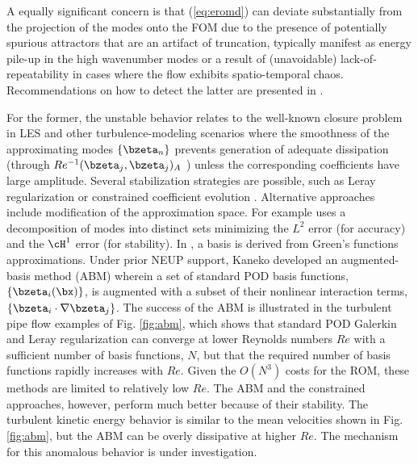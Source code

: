 A equally significant concern is that (\ref{eq:eromd}) can deviate substantially
from the projection of the modes onto the FOM due to the presence of potentially
spurious attractors that are an artifact of truncation, typically manifest as
energy pile-up in the high wavenumber modes \cite{fick18,rempfer00} or a
result of (unavoidable) lack-of-repeatability in cases where the flow 
exhibits spatio-temporal chaos.  Recommendations on how to detect the latter
are presented in \cite{tsai22a}.  

For the former, the unstable behavior relates to the well-known closure problem
in LES and other turbulence-modeling scenarios where the smoothness of the
approximating modes $\{\bzeta_n\}$ prevents generation of adequate dissipation
(through $Re^{-1} (\bzeta_j,\bzeta_j)_A$ ) unless the corresponding
coefficients have large amplitude.  
Several stabilization strategies are possible, such as Leray regularization
\cite{wang2012proper} or constrained coefficient evolution
\cite{fick18,kaneko20a}.  Alternative approaches include modification of the
approximation space.  For example \cite{akkari19} uses a decomposition of modes
into distinct sets minimizing the $L^2$ error (for accuracy) and the $\cH^1$
error (for stability).  In \cite{khodkar2019}, a basis is derived from Green's
functions approximations.
   Under prior NEUP support, Kaneko \cite{kaneko22a,kaneko22} developed an
augmented-basis method (ABM) wherein a set of standard POD basis functions,
$\{\bzeta_i(\bx) \}$,  is augmented with a subset of their nonlinear interaction
terms, $\{\bzeta_i \cdot \nabla \bzeta_j\}$.
  The success of the ABM is illustrated in the turbulent pipe flow
examples of Fig. \ref{fig:abm}, which shows that standard POD Galerkin and
Leray regularization can converge at lower Reynolds numbers $Re$ with a
sufficient number of basis functions, $N$, but that the required number of
basis functions rapidly increases with $Re$.  Given the $O(N^3)$ costs for the
ROM, these methods are limited to relatively low $Re$.  The ABM and
the constrained approaches, however, perform much better because of their
stability.  The turbulent kinetic energy behavior is similar to the
mean velocities shown in Fig. \ref{fig:abm}, but the ABM
can be overly dissipative at higher $Re$.  The mechanism for this anomalous
behavior is under investigation.




